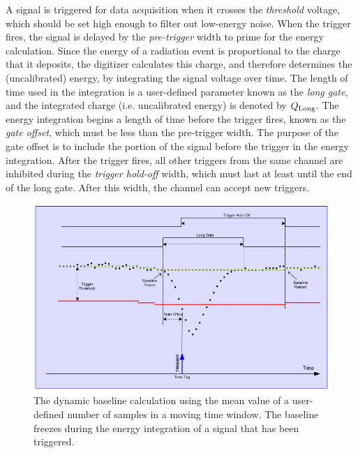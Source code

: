 
A signal is triggered for data acquisition when it crosses the \textit{threshold} voltage, which should be set high enough to filter out low-energy noise. When the trigger fires, the signal is delayed by the \textit{pre-trigger} width to prime for the energy calculation. Since the energy of a radiation event is proportional to the charge that it deposits, the digitizer calculates this charge, and therefore determines the (uncalibrated) energy, by integrating the signal voltage over time. The length of time used in the integration is a user-defined parameter known as the \textit{long gate}, and the integrated charge (i.e. uncalibrated energy) is denoted by $Q_{\textnormal{Long}}$. The energy integration begins a length of time before the trigger fires, known as the \textit{gate offset}, which must be less than the pre-trigger width. The purpose of the gate offset is to include the portion of the signal before the trigger in the energy integration. After the trigger fires, all other triggers from the same channel are inhibited during the \textit{trigger hold-off} width, which must last at least until the end of the long gate. After this width, the channel can accept new triggers. 


\begin{figure}[b!]
\centering
\includegraphics[scale=0.38]{Chapter-5/figs/baseline.png}
\caption{The dynamic baseline calculation using the mean value of a user-defined number of samples in a moving time window. The baseline freezes during the energy integration of a signal that has been triggered.}
\label{baseline_calc}
\end{figure}

